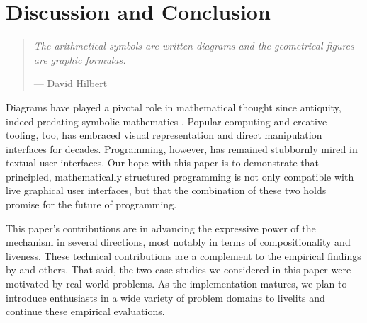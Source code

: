 \section{Discussion and Conclusion}\label{sec:discussion}\label{sec:conclusion}
\begin{quote}
  \textit{
  The arithmetical symbols are written diagrams and the geometrical figures are graphic formulas.
  }
  
  \vspace{3pt}
  
  \hfill{}--- David Hilbert~\cite{hilbert1902mathematical}
  \end{quote}

  \noindent
  Diagrams have played a pivotal role in mathematical thought since antiquity,
  indeed predating symbolic mathematics \cite{cajori1993history}. 
  Popular computing and creative tooling, too, has embraced visual representation and direct manipulation 
  interfaces for decades.
  Programming, however, has remained stubbornly mired in textual user interfaces. 
  Our hope with this paper is to demonstrate that principled, mathematically structured
  programming is not only compatible with live graphical user interfaces, but that the 
  combination of these two holds promise for the future of programming.

  This paper's contributions are 
  in advancing the expressive power of the mechanism in several directions, 
  most notably in terms of compositionality and liveness. These 
  technical contributions are a complement to the empirical findings by \citet{Graphite} and others.
  That said, the two case studies we considered in this paper were motivated by 
  real world problems. 
  As the implementation
  matures, we plan to introduce enthusiasts in a wide variety of problem domains
  to livelits and continue these empirical evaluations.



